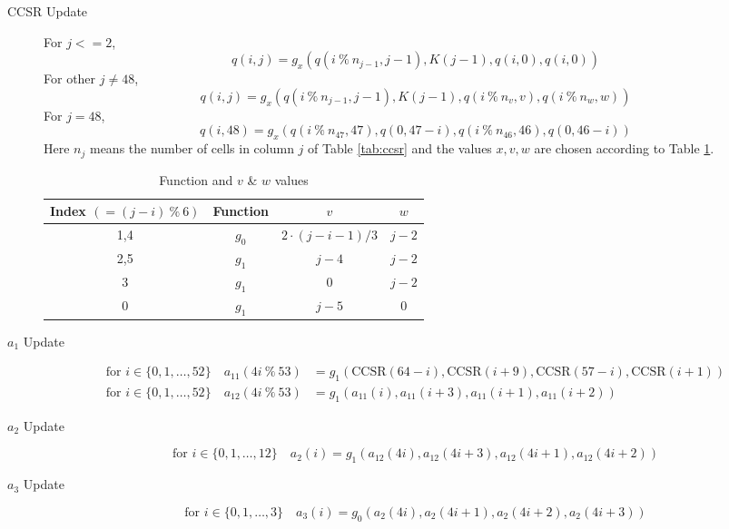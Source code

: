 \documentclass[a4paper,10pt]{article}
\begin{document}
\begin{description}
    \item[CCSR Update]  For $j <= 2$,
    \begin{equation}
        q(i,j) = g_x(q(i \ \%\ n_{j-1}, j-1), K(j-1), q(i, 0), q(i, 0))
    \end{equation}
    For other $j \neq 48$,
    \begin{equation}
        q(i,j) = g_x(q(i \ \%\ n_{j-1}, j-1), K(j-1), q(i \ \%\ n_{v}, v), q(i \ \%\ n_{w}, w))
    \end{equation}
    For $j = 48$,
    \begin{equation}
        q(i,48) = g_x(q(i \ \%\ n_{47}, 47), q(0, 47 -i), q(i \ \%\ n_{46}, 46), q(0, 46 -i))
    \end{equation}
    Here $n_{j}$ means the number of cells in column $j$ of Table \ref{tab:ccsr} and the values $x, v, w$ are chosen according to Table \ref{tab:xvw}.

\begin{table}[h]
\centering
\begin{tabular}{cccc}
Index $(=(j-i)\ \% \ 6)$ & Function & $v$             & $w$     \\\hline
1,4   & $g_0$    & $2\cdot(j-i-1)/3$ & $j-2$ \\
2,5   & $g_1$    & $j-4$         & $j-2$ \\
3     & $g_1$    & 0             & $j-2$ \\
0     & $g_1$    & $j-5$         & 0    
\end{tabular}
\caption{Function and $v$ \& $w$ values}
\label{tab:xvw}
\end{table}
    \item[$a_{1}$ Update]
    \begin{equation}
        \begin{aligned}
            \text{for } i \in \{0,1,\ldots,52\} \quad a_{11}(4i \ \%\ 53) &= g_1(\text{CCSR}(64-i), \text{CCSR}(i+9), \text{CCSR}(57-i), \text{CCSR}(i+1))\\
            \text{for } i \in \{0,1,\ldots,52\} \quad a_{12}(4i \ \%\ 53) &= g_1(a_{11}(i), a_{11}(i+3), a_{11}(i+1), a_{11}(i+2))
        \end{aligned}
    \end{equation}
    \item[$a_{2}$ Update]
    \begin{equation}
            \text{for } i \in \{0,1,\ldots,12\} \quad a_{2}(i) = g_1(a_{12}(4i), a_{12}(4i+3), a_{12}(4i+1), a_{12}(4i+2))
    \end{equation}
    \item[$a_{3}$ Update]
    \begin{equation}
            \text{for } i \in \{0,1,\ldots,3\} \quad a_{3}(i) = g_0(a_{2}(4i), a_{2}(4i+1), a_{2}(4i+2), a_{2}(4i+3))
    \end{equation}
\end{description}
\end{document}
